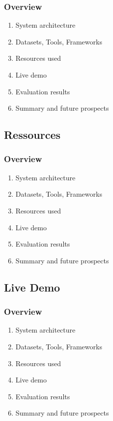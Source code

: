 \documentclass[11pt,t,usepdftitle=false,aspectratio=169]{beamer}
\begin{document}
\begin{frame}
	\frametitle{Overview}
	
	
	\bigskip
	\begin{enumerate}
		\item {System architecture}
		\item Datasets, Tools, Frameworks
		\item Resources used
		\item {Live demo}
		\item {Evaluation results}
		\item Summary and future prospects
	\end{enumerate}
	
\end{frame}

\subsection{Ressources}

\begin{frame}
	\frametitle{Overview}
	
	
	\bigskip
	\begin{enumerate}
		\item {System architecture}
		\item Datasets, Tools, Frameworks
		\item Resources used
		\item {Live demo}
		\item {Evaluation results}
		\item Summary and future prospects
	\end{enumerate}
	
\end{frame}

\subsection{Live Demo}

\begin{frame}
	\frametitle{Overview}
	
	
	\bigskip
	\begin{enumerate}
		\item {System architecture}
		\item Datasets, Tools, Frameworks
		\item Resources used
		\item {Live demo}
		\item {Evaluation results}
		\item Summary and future prospects
	\end{enumerate}
	
\end{frame}
\end{document}
